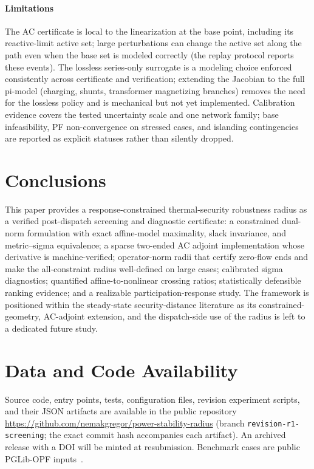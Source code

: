 \documentclass[11pt]{article}
\begin{document}
\paragraph{Limitations}
The AC certificate is local to the linearization at the base point,
including its reactive-limit active set; large perturbations can change the
active set along the path even when the base set is modeled correctly (the
replay protocol reports these events).  The lossless series-only surrogate
is a modeling choice enforced consistently across certificate and
verification; extending the Jacobian to the full pi-model (charging,
shunts, transformer magnetizing branches) removes the need for the lossless
policy and is mechanical but not yet implemented.  Calibration evidence
covers the tested uncertainty scale and one network family; base
infeasibility, PF non-convergence on stressed cases, and islanding
contingencies are reported as explicit statuses rather than silently
dropped.

\section{Conclusions}

This paper provides a response-constrained thermal-security robustness
radius as a verified post-dispatch screening and diagnostic certificate:
a constrained dual-norm formulation with exact affine-model maximality,
slack invariance, and metric--sigma equivalence; a sparse two-ended AC
adjoint implementation whose derivative is machine-verified; operator-norm
radii that certify zero-flow ends and make the all-constraint radius
well-defined on large cases; calibrated sigma diagnostics; quantified
affine-to-nonlinear crossing ratios; statistically defensible ranking
evidence; and a realizable participation-response study.  The framework is
positioned within the steady-state security-distance literature as its
constrained-geometry, AC-adjoint extension, and the dispatch-side use of
the radius is left to a dedicated future study.

\section*{Data and Code Availability}

Source code, entry points, tests, configuration files, revision experiment
scripts, and their JSON artifacts are available in the public repository
\url{https://github.com/nemakgregor/power-stability-radius} (branch
\texttt{revision-r1-screening}; the exact commit hash accompanies each
artifact).  An archived release with a DOI will be minted at
resubmission.  Benchmark cases are public PGLib-OPF
inputs~\citep{PGLibOPF2019}.



\end{document}

